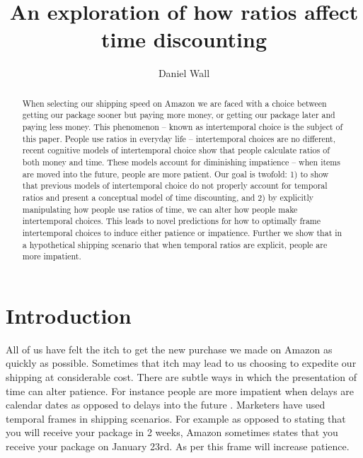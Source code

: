\documentclass[]{article}
\title{An exploration of how ratios affect time discounting}
\author{Daniel Wall}
\begin{document}
\maketitle

\begin{abstract}
	When selecting our shipping speed on Amazon we are faced with a choice between getting our package sooner but paying more money, or getting our package later and paying less money. 
	This phenomenon -- known as intertemporal choice is the subject of this paper.
	People use ratios in everyday life -- intertemporal choices are no different, 
	recent cognitive models of intertemporal choice show that people calculate ratios of both money and time. 
	These models account for diminishing impatience -- when items are moved into the future, people are more patient. 
	Our goal is twofold: 1) to show that previous models of intertemporal choice do not properly account for temporal ratios and present a conceptual model of time discounting, and  2) by explicitly manipulating how people use ratios of time, we can alter how people make intertemporal choices. 
	This leads to novel predictions for how to optimally frame intertemporal choices to induce either patience or impatience. 
	Further we show that in a hypothetical shipping scenario that when temporal ratios are explicit, people are more impatient. 
	
\end{abstract}

\section{Introduction}

All of us have felt the itch to get the new purchase we made on Amazon as quickly as possible. 
Sometimes that itch may lead to us choosing to expedite our shipping at considerable cost. 
There are subtle ways in which the presentation of time can alter patience. 
For instance people are more impatient when delays are calendar dates as opposed to delays into the future \cite{Read2005}. 
Marketers have used temporal frames in shipping scenarios.
For example as opposed to stating that you will receive your package in 2 weeks, Amazon sometimes states that you receive your package on January 23rd. 
As per  this frame will increase patience. 

\end{document}
